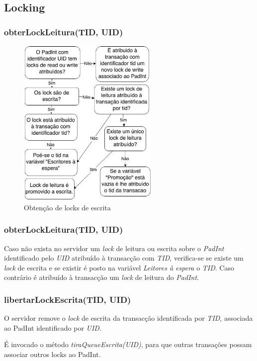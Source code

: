 \subsection{Locking}

\subsubsection{obterLockLeitura(TID, UID)}

\begin{figure}[H]
\centering
\includegraphics[width=6.75cm]{obtem_lock_w.jpg}
\caption{Obtenção de locks de escrita}
\end{figure}

\subsubsection{obterLockLeitura(TID, UID)}


Caso não exista no servidor um \textit{lock} de leitura ou escrita sobre o \textit{PadInt} identificado pelo \textit{UID} atribuído à transacção com \textit{TID}, verifica-se se existe um \textit{lock} de escrita e se existir é posto na variável \textit{Leitores à espera} o \textit{TID}. Caso contrário é atribuído à transacção um \textit{lock} de leitura do \textit{PadInt}.

\subsubsection{libertarLockEscrita(TID, UID)}

O servidor remove o \textit{lock} de escrita da transacção identificada por \textit{TID}, associada ao PadInt identificado por \textit{UID}.

É invocado o método \textit{tiraQueueEscrita(UID)}, para que outras transações possam associar outros locks ao PadInt.

